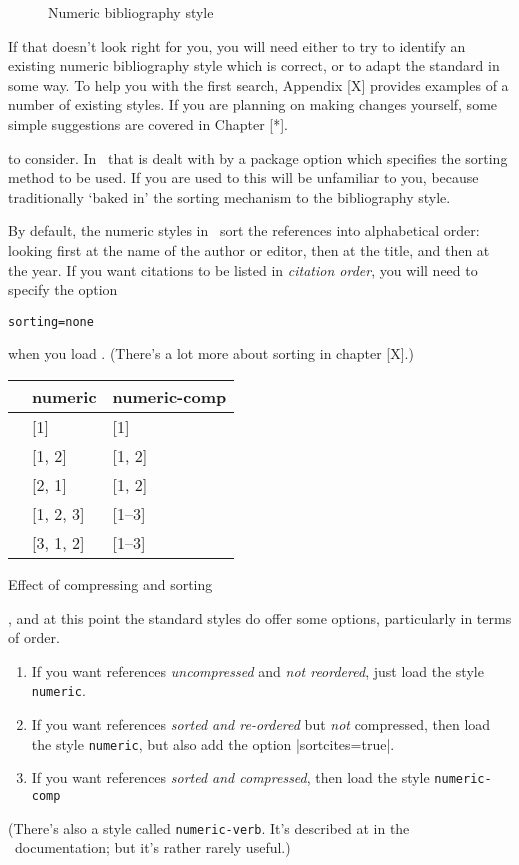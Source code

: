 \begin{figure}
\caption{Numeric bibliography style\label{numeric-examples}}
\end{figure}

If that doesn't look right for you, you will need either to try to
identify an existing numeric bibliography style which is correct, or
to adapt the standard in some way. To help you with the first search,
Appendix [X] provides examples of a number of existing styles. If you
are planning on making changes yourself, some simple suggestions are
covered in Chapter [*].

 to consider. In \biblatex\ that
is dealt with by a package option which specifies the sorting method
to be used. If you are used to  this will be
unfamiliar to you, because traditionally  `baked in'
the sorting mechanism to the bibliography style.

By default, the numeric styles in \biblatex\ sort the references into
alphabetical order: looking first at the name of the author or editor,
then at the title, and then at the year. If you want citations to be
listed in \emph{citation order}, you will need to specify the option
\begin{center}
\verb|sorting=none|
\end{center}

when you load \biblatex. (There's a lot more about sorting in chapter
[X].)


\begin{margintable}[4cm]
\begin{tabular}{lll}
\toprule
& \textsf{numeric} & \parbox{6ex}{\textsf{numeric-comp}} \\
\midrule{} & [1] & [1] \\
 & [1, 2] & [1, 2] \\
 & [2, 1] & [1, 2] \\
 & [1, 2, 3] & [1--3] \\
 & [3, 1, 2] & [1--3] \\
\bottomrule
\end{tabular}
\caption{Effect of compressing and sorting}
\end{margintable}
, and at
this point the standard styles do offer some options, particularly in
terms of order.
\begin{enumerate}
\item If you want references \emph{uncompressed} and \emph{not
    reordered}, just load the style \verb|numeric|.
\item If you want references \emph{sorted and re-ordered} but
  \emph{not} compressed, then load the style \verb|numeric|, but also
  add the option |sortcites=true|.
\item If you want references \emph{sorted and compressed}, then load the
  style \verb|numeric-comp|
\end{enumerate}
(There's also a style called
  \texttt{numeric-verb}. It's described at in the \biblatex\
  documentation; but it's rather rarely useful.)

